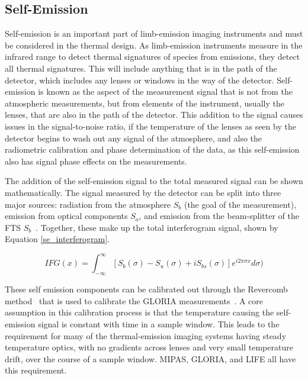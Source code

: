 \subsection{Self-Emission}\label{self-emission}

Self-emission is an important part of limb-emission imaging instruments and must be considered in the thermal design. As limb-emission instruments measure in the infrared range to detect thermal signatures of species from emissions, they detect all thermal signatures. This will include anything that is in the path of the detector, which includes any lenses or windows in the way of the detector. Self-emission is known as the aspect of the measurement signal that is not from the atmospheric measurements, but from elements of the instrument, usually the lenses, that are also in the path of the detector. This addition to the signal causes issues in the signal-to-noise ratio, if the temperature of the lenses as seen by the detector begins to wash out any signal of the atmosphere, and also the radiometric calibration and phase determination of the data, as this self-emission also has signal phase effects on the measurements.

The addition of the self-emission signal to the total measured signal can be shown mathematically. The signal measured by the detector can be split into three major sources: radiation from the atmosphere $S_b$ (the goal of the measurement), emission from optical components $S_o$, and emission from the beam-splitter of the FTS $S_b$~\citep{self-emission_general}. Together, these make up the total interferogram signal, shown by Equation \ref{se_interferogram}. 

\begin{equation}\label{se_interferogram}
    IFG(x) = \int_{-\infty}^{\infty} [S_b(\sigma) - S_u(\sigma) + iS_{bs}(\sigma)]e^{i2\pi\sigma x} d\sigma)
\end{equation}

These self emission components can be calibrated out through the Revercomb method~\citep{Revercomb_method} that is used to calibrate the GLORIA measurements~\citep{gloria_self_emission}. A core assumption in this calibration process is that the temperature causing the self-emission signal is constant with time in a sample window. This leads to the requirement for many of the thermal-emission imaging systems having steady temperature optics, with no gradients across lenses and very small temperature drift, over the course of a sample window. MIPAS, GLORIA, and LIFE all have this requirement.

